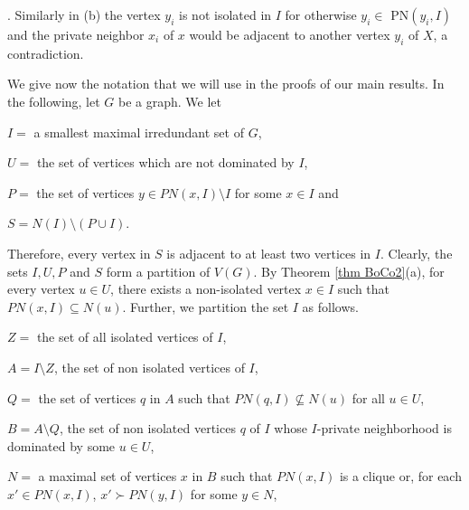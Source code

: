 \documentclass[11pt]{article}
\newcommand{\qed}{$\Box$}
\newcommand{\proof}{\noindent\textbf{Proof. }}
\newcommand{\2}{ \vspace{0.2cm} }
\newcommand{\1}{ \vspace{0.1cm} }
\begin{document}
. Similarly in (b) the vertex $y_i$ is not isolated in $I$ for otherwise $y_i\in$ PN$(y_i,I)$ and the private neighbor $x_i$ of $x$ would be adjacent to another vertex $y_i$ of $X$, a contradiction.



We give now the notation that we will use  in the proofs of our main results. In the following, let $G$ be a graph. We let

\indent $I =$ a smallest maximal irredundant set of $G$,


\indent $U =$ the set of vertices which are not dominated by $I$,

\indent $P =$ the set of vertices $y \in PN(x, I) \setminus I$ for some $x \in I$ and

\indent $S = N(I) \setminus (P \cup I)$.

\noindent Therefore, every vertex in $S$ is adjacent to at least two vertices in $I$.  Clearly, the sets $I, U, P$ and $S$ form a partition of $V(G)$. By Theorem \ref{thm BoCo2}(a), for every vertex $u \in U$, there exists a non-isolated vertex $x \in I$ such that $PN(x, I) \subseteq N(u)$. Further, we partition the set $I$  as follows.

\indent $Z =$ the set of all isolated vertices of $I$,

\indent $A = I \setminus Z$, the set of non isolated vertices of $I$,

\indent $Q =$ the set of vertices $q$ in $A$ such that $PN(q, I) \nsubseteq N(u)$ for all $u \in U$,

\indent $B = A \setminus Q$, the set of non isolated vertices $q$ of $I$ whose $I$-private neighborhood is dominated by some $u\in U$,

\indent $N =$ a maximal set of vertices $x$ in $B$ such that $PN(x, I)$ is a clique or, for each $x' \in PN(x, I)$, $x' \succ PN(y, I)$ for some $y \in N$,
\end{document}
